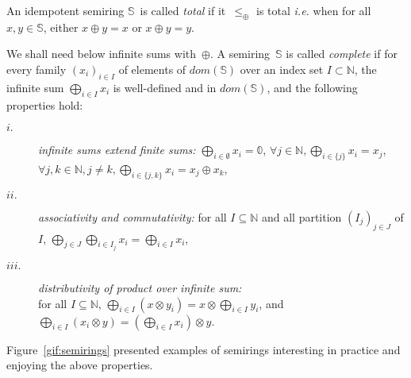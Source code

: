 \documentclass[runningheads]{llncs}
\def\ie{\textit{i.e.}\xspace}
\newcommand{\Semiring}{\mathbb{S}}
\newcommand{\zero}{\mathbb{0}}
\newcommand{\dom}{\ensuremath{\mathit{dom}}}
\begin{document}
\noindent
An idempotent semiring $\Semiring$~is called \emph{total} if
it~$\leq_\oplus$ is total
\ie when for all $x, y \in \Semiring$, either $x \oplus y = x$ or $x \oplus y = y$.

We shall need below infinite sums with~$\oplus$.
A semiring~$\Semiring$ is called \emph{complete} 
if for every family
$(x_i)_{i \in I}$ %
of elements of $\dom(\Semiring)$ over an index set $I \subset \mathbb{N}$,
the infinite sum $\bigoplus_{i \in I} x_i$
is well-defined and in $\dom(\Semiring)$,
and the following properties hold:
\begin{description}
\item[$i.$]
\emph{infinite sums extend finite sums:}
$\displaystyle\bigoplus_{i \in \emptyset} x_i = \zero$,\quad 
      $\forall j\in \mathbb{N}, \displaystyle\bigoplus_{i \in \{ j \}} x_i = x_j$,\quad
      $\forall j, k\in \mathbb{N}, j\neq k, 
      \displaystyle\bigoplus_{i \in \{ j, k \}} x_i = x_j \oplus x_k$,
%
\item[$ii.$]
\emph{associativity and commutativity:}
for all $I \subseteq \mathbb{N}$
and all partition $(I_{j})_{j \in J}$ of $I$, %
\(
\displaystyle
\bigoplus_{j \in J}\bigoplus_{i \in I_j} x_i = 
\bigoplus_{i \in I} x_i
\),
%
\item[$iii.$] 
\emph{distributivity of product over infinite sum:}\\
for all $I \subseteq \mathbb{N}$,
\(
\displaystyle
\bigoplus_{i \in I} (x \otimes y_i) = x \otimes \bigoplus_{i\in I} y_i\), and
\(
\displaystyle
\bigoplus_{i \in I} (x_i \otimes y) = (\bigoplus_{i \in I} x_i ) \otimes y\).
\end{description}



\begin{example}
Figure~\ref{gif:semirings} presented examples of semirings interesting in practice 
and enjoying the above properties.
\end{example}
\end{document}
